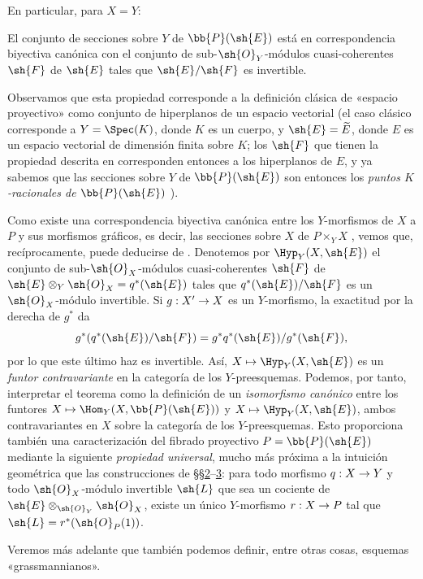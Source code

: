 \documentclass[oneside,10pt]{amsart}
\makeatletter
\newcommand{\ega@arrow}[2]{\mathchoice{#1}{#2}{#2}{#2}}
\let\ega@shortmapsto\mapsto
\renewcommand{\to}{\ega@arrow{\longrightarrow}{\rightarrow}}
\renewcommand{\mapsto}{\ega@arrow{\longmapsto}{\ega@shortmapsto}}
\let\EGAOriginalLabel\label
\renewcommand{\label}[1]{\phantomsection\EGAOriginalLabel{#1}}
\makeatother
\begin{document}
En particular, para $X=Y$:
\begin{theorem}[4.2.4]
\label{II.4.2.4}
El conjunto de secciones sobre $Y$ de $\bb{P}(\sh{E})$ está en correspondencia biyectiva canónica con el conjunto de sub-$\sh{O}_Y$-módulos cuasi-coherentes $\sh{F}$ de $\sh{E}$ tales que $\sh{E}/\sh{F}$ es invertible.
\end{theorem}

Observamos que esta propiedad corresponde a la definición clásica de «espacio proyectivo» como conjunto de hiperplanos de un espacio vectorial (el caso clásico corresponde a $Y=\Spec(K)$, donde $K$ es un cuerpo, y $\sh{E}=\widetilde{E}$, donde $E$ es un espacio vectorial de dimensión finita sobre $K$; los $\sh{F}$ que tienen la propiedad descrita en  corresponden entonces a los hiperplanos de $E$, y ya sabemos que las secciones sobre $Y$ de $\bb{P}(\sh{E})$ son entonces los \emph{puntos $K$-racionales de $\bb{P}(\sh{E})$} ).

\begin{remark}[4.2.5]
\label{II.4.2.5}
Como existe una correspondencia biyectiva canónica entre los $Y$-morfismos de $X$ a $P$ y sus morfismos gráficos, es decir, las secciones sobre $X$ de $P\times_Y X$ , vemos que, recíprocamente,  puede deducirse de .
Denotemos por $\Hyp_Y(X,\sh{E})$ el conjunto de sub-$\sh{O}_X$-módulos cuasi-coherentes $\sh{F}$ de $\sh{E}\otimes_Y\sh{O}_X=q^*(\sh{E})$ tales que $q^*(\sh{E})/\sh{F}$ es un $\sh{O}_X$-módulo invertible.
Si $g:X'\to X$ es un $Y$-morfismo, la exactitud por la derecha de $g^*$ da
\[
  g^*(q^*(\sh{E})/\sh{F})=g^*q^*(\sh{E})/g^*(\sh{F}),
\]
por lo que este último haz es invertible. Así, $X\mapsto\Hyp_Y(X,\sh{E})$ es un \emph{funtor contravariante} en la categoría de los $Y$-preesquemas.
Podemos, por tanto, interpretar el teorema  como la definición de un \emph{isomorfismo canónico} entre los funtores $X\mapsto\Hom_Y(X,\bb{P}(\sh{E}))$ y $X\mapsto\Hyp_Y(X,\sh{E})$, ambos contravariantes en $X$ sobre la categoría de los $Y$-preesquemas.
Esto proporciona también una caracterización del fibrado proyectivo $P=\bb{P}(\sh{E})$ mediante la siguiente \emph{propiedad universal}, mucho más próxima a la intuición geométrica que las construcciones de §§\hyperref[section:II.2]{2}--\hyperref[section:II.3]{3}:
para todo morfismo $q:X\to Y$ y todo $\sh{O}_X$-módulo invertible $\sh{L}$ que sea un cociente de $\sh{E}\otimes_{\sh{O}_Y}\sh{O}_X$, existe un único $Y$-morfismo $r:X\to P$ tal que $\sh{L}=r^*(\sh{O}_P(1))$.

Veremos más adelante que también podemos definir, entre otras cosas, esquemas «grassmannianos».
\end{remark}
\end{document}
